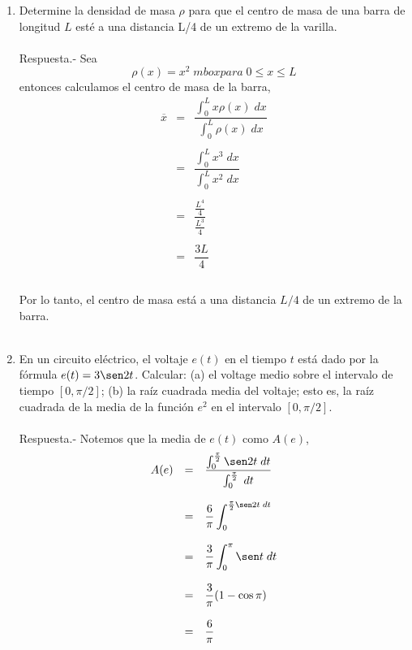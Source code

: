 \begin{enumerate}[\bfseries 1.]
\item Determine la densidad de masa $\rho$ para que el centro de masa de una barra de longitud $L$ esté a una distancia L/4 de un extremo de la varilla.\\\\
    Respuesta.-\; Sea $$\rho(x)=x^2\; mbox{para}\; 0\leq x \leq L$$
    entonces calculamos el centro de masa de la barra,
    $$\begin{array}{rcl}
	\overline{x}&=&\dfrac{\int_0^L x\rho(x)\; dx}{\int_0^L \rho(x)\; dx}\\\\
		    &=&\dfrac{\int_0^L x^3\; dx}{\int_0^L x^2\; dx}\\\\
		    &=&\dfrac{\frac{L^4}{4}}{\frac{L^3}{4}}\\\\
		    &=&\dfrac{3L}{4}\\\\
    \end{array}$$

    Por lo tanto, el centro de masa está a una distancia $L/4$ de un extremo de la barra.\\\\

\item En un circuito eléctrico, el voltaje $e(t)$ en el tiempo $t$ está dado por la fórmula $e(t)=3\sen 2t$. Calcular: (a) el voltage medio sobre el intervalo de tiempo $[0,\pi/2]$; (b) la raíz cuadrada media del voltaje; esto es, la raíz cuadrada de la media de la función $e^2$ en el intervalo $[0,\pi/2]$.\\\\
    Respuesta.-\; Notemos que la media de $e(t)$ como $A(e)$,
    $$\begin{array}{rcl}
	A(e)&=&\dfrac{\int_0^{\frac{\pi}{2}}\sen 2t\; dt}{\int_0^{\frac{\pi}{2}}\; dt}\\\\
	    &=&\dfrac{6}{\pi}\displaystyle\int_0^{\frac{\pi}{2}\sen 2t\; dt}\\\\
	    &=&\dfrac{3}{\pi}\displaystyle\int_0^\pi \sen t\; dt\\\\
	    &=&\dfrac{3}{\pi}(1-\cos \pi)\\\\
	    &=&\dfrac{6}{\pi}\\\\
    \end{array}$$


\end{enumerate}

